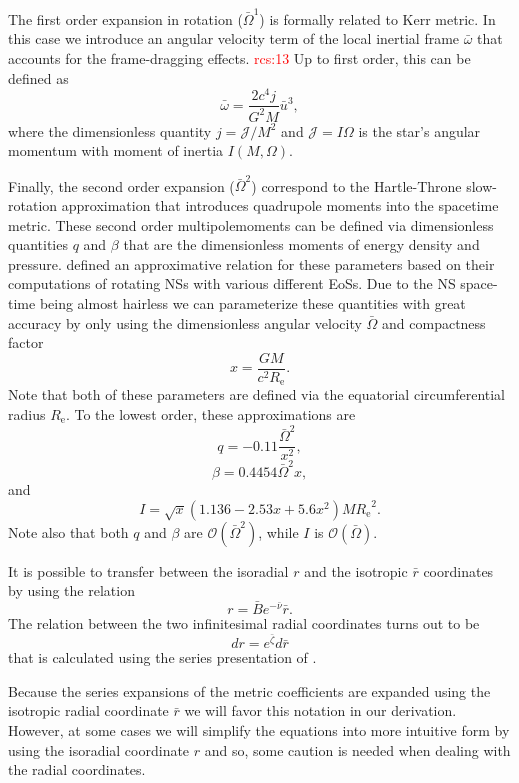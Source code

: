 \documentclass[iop, usenatbib]{emulateapj}
\newcommand{\be}{\begin{equation}}
\newcommand{\ee}{\end{equation}}
\newcommand{\red}[1]{\textcolor{red}{#1}}
\newcommand{\Req}{\ensuremath{R_{\mathrm{e}}}}
\newcommand{\rb}{\ensuremath{\bar{r}}}
\renewcommand{\ub}{\ensuremath{\bar{u}}}
\newcommand{\wb}{\ensuremath{\bar{\omega}}}
\newcommand{\Ob}{\ensuremath{\bar{\Omega}}}
\newcommand{\nub}{\ensuremath{\bar{\nu}}}
\newcommand{\zetab}{\ensuremath{\bar{\zeta}}}
\newcommand{\Bb}{\ensuremath{\bar{B}}}
\begin{document}
The first order expansion in rotation ($\Ob^1$) is formally related to Kerr metric.
In this case we introduce an angular velocity term of the local inertial frame $\wb$ that accounts for the frame-dragging effects. \red{rcs:13}
Up to first order, this can be defined as
\be
\wb = \frac{2c^4j}{G^2M}\ub^3,
\ee
where the dimensionless quantity $j=\mathcal{J}/M^2$ and $\mathcal{J} = I \Omega$ is the star's angular momentum with moment of inertia $I(M,\Omega)$.

Finally, the second order expansion ($\Ob^2$) correspond to the Hartle-Throne slow-rotation approximation that introduces quadrupole moments into the spacetime metric.
These second order multipolemoments can be defined via dimensionless quantities $q$ and $\beta$ that are the dimensionless moments of energy density and pressure.
\citet{aGM14} defined an approximative relation for these parameters based on their computations of rotating NSs with various different EoSs.
Due to the NS space-time being almost hairless we can parameterize these quantities with great accuracy by only using the dimensionless angular velocity $\Ob$ and compactness factor
\be
x = \frac{G M}{c^2 \Req}.
\ee
Note that both of these parameters are defined via the equatorial circumferential radius \Req.
To the lowest order, these approximations are
\be
q = -0.11 \frac{\Ob^2}{x^2},
\ee
\be
\beta = 0.4454 \Ob^2 x,
\ee
and
\be
I = \sqrt{x} (1.136 - 2.53 x + 5.6 x^2) M \Req^2.
\ee
Note also that both $q$ and $\beta$ are $\mathcal{O}(\Ob^2)$, while $I$ is $\mathcal{O}(\Ob)$.
    
It is possible to transfer between the isoradial $r$ and the isotropic $\rb$ coordinates by using the relation \citep{FIP86}
\be
r = \Bb e^{-\nub} \rb.
\ee
The relation between the two infinitesimal radial coordinates turns out to be
\be
dr = e^{\zetab} d\rb
\ee
that is calculated using the series presentation of \cite{BI76}.

Because the series expansions of the metric coefficients are expanded using the isotropic radial coordinate $\rb$ we will favor this notation in our derivation.
However, at some cases we will simplify the equations into more intuitive form by using the isoradial coordinate $r$ and so, some caution is needed when dealing with the radial coordinates.

\end{document}
